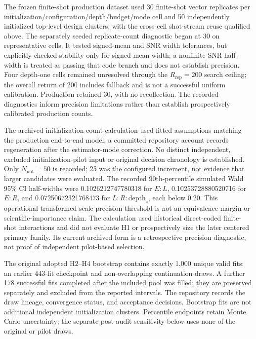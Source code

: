 \documentclass[pdflatex,sn-basic,Numbered]{sn-jnl}
\begin{document}
The frozen finite-shot production dataset used 30 finite-shot vector replicates per initialization/configuration/depth/budget/mode cell and 50 independently initialized top-level design clusters, with the cross-cell shot-stream reuse qualified above. The separately seeded replicate-count diagnostic began at 30 on representative cells. It tested signed-mean and SNR width tolerances, but explicitly checked stability only for signed-mean width; a nonfinite SNR half-width is treated as passing that code branch and does not establish precision. Four depth-one cells remained unresolved through the $R_{\mathrm{rep}}=200$ search ceiling; the overall return of 200 includes fallback and is not a successful uniform calibration. Production retained 30, with no recollection. The recorded diagnostics inform precision limitations rather than establish prospectively calibrated production counts.

The archived initialization-count calculation used fitted assumptions matching the production end-to-end model; a committed repository account records regeneration after the estimator-mode correction. No distinct independent, excluded initialization-pilot input or original decision chronology is established. Only $N_{\mathrm{init}}=50$ is recorded; 25 was the configured increment, not evidence that larger candidates were evaluated. The recorded 90th-percentile simulated Wald 95\% CI half-widths were 0.1026212747780318 for $E{:}L$, 0.10253728880520716 for $E{:}R$, and 0.07250672321768473 for $L{:}R{:}\mathrm{depth}_z$, each below 0.20. This operational transformed-scale precision threshold is not an equivalence margin or scientific-importance claim. The calculation used historical direct-coded finite-shot interactions and did not evaluate H1 or prospectively size the later centered primary family. Its current archived form is a retrospective precision diagnostic, not proof of independent pilot-based selection.

The original adopted H2--H4 bootstrap contains exactly 1,000 unique valid fits: an earlier 443-fit checkpoint and non-overlapping continuation draws. A further 178 successful fits completed after the included pool was filled; they are preserved separately and excluded from the reported intervals. The repository records the draw lineage, convergence status, and acceptance decisions. Bootstrap fits are not additional independent initialization clusters. Percentile endpoints retain Monte Carlo uncertainty; the separate post-audit sensitivity below uses none of the original or pilot draws.
\end{document}
